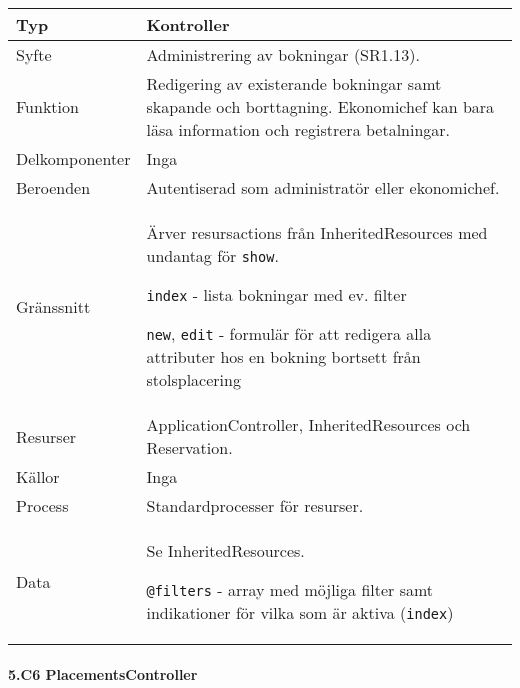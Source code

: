 \documentclass[a4paper, twoside, 11pt, titlepage]{article}
\begin{document}
			\begin {table} [ht] \begin{tabular} {  p{3.5cm} p{9.6cm} }
				\hline
				{Typ} & {Kontroller} \\
				\hline
				{Syfte} & {Administrering av bokningar (SR1.13).} \\
				\hline
				{Funktion} & {Redigering av existerande bokningar samt skapande och borttagning. Ekonomichef kan bara läsa information och registrera betalningar.} \\
				\hline
				{Delkomponenter} & {Inga} \\
				\hline
				{Beroenden} & {Autentiserad som administratör eller ekonomichef.} \\
				\hline
				{Gränssnitt} & {Ärver resursactions från InheritedResources med undantag för {\tt show}.

{\tt index} - lista bokningar med ev. filter

{\tt new}, {\tt edit} - formulär för att redigera alla attributer hos en bokning bortsett från stolsplacering} \\
				\hline
				{Resurser} & {ApplicationController, InheritedResources och Reservation.} \\
				\hline
				{Källor} & {Inga} \\
				\hline
				{Process} & {Standardprocesser för resurser.} \\
				\hline
				{Data} & {Se InheritedResources.

{\tt @filters} - array med möjliga filter samt indikationer för vilka som är aktiva ({\tt index})} \\
				\hline
			\end{tabular} \end{table} \FloatBarrier


			\paragraph{5.C6 PlacementsController}\
\end{document}
